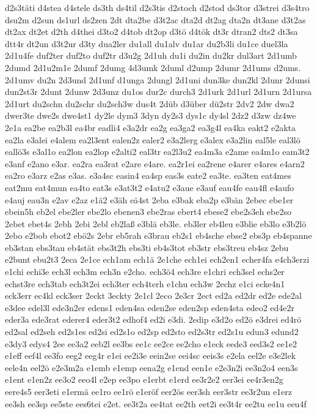 {d2s3täti
d4stea
d4stele
ds3th
ds4til
d2s3tis
d2stoch
d2stod
ds3tor
d3strei
d3s4tro
dsu2m
d2sun
ds1url
ds2zen
2dt
dta2be
d3t2ac
dta2d
dt2ag
dta2n
dt3ane
d3t2as
dt2ax
dt2et
d2th
d4thei
d3to2
d4tob
dt2op
d3tö
d4tök
dt3r
dtran2
dts2
dt3sa
dtt4r
dt2un
d3t2ur
d3ty
dua2ler
du1all
du1alv
du1ar
du2b3li
du1ce
duel3la
2d1u4fe
duf2ter
duf2to
duf2tr
d3u2g
2d1uh
du1i
du2in
du2kr
dul3art
2d1umb
2dumd
2d1u2m1e
2dumf
2dumg
4d3umk
2duml
d2ump
2dumr
2d1ums
d2ums.
2d1umv
du2n
2d3und
2d1unf
d1unga
2dungl
2d1uni
dun3ke
dun2kl
2dunr
2dunsi
dun2st3r
2dunt
2dunw
2d3unz
du1os
dur2c
durch3
2d1urk
2d1url
2d1urn
2d1ursa
2d1urt
du2schn
du2schr
du2sch3w
dus4t
2düb
d3über
dü2str
2dv2
2dw
dwa2
dwer3te
dwe2s
dwe4st1
dy2le
dym3
3dyn
dy2s3
dys1c
dy4sl
2dz2
d3zw
dz4we
2e1a
ea2be
ea2b3l
ea4br
eadli4
e3a2dr
ea2g
ea3ga2
ea3g4l
ea4ka
eakt2
e2akta
ea2la
e3alei
e4alem
ea2l3ent
ealen2z
ealer2
e3a2lerg
e3alex
e3a2lin
eal5le
eal3lö
eallö3s
e3al1o
ea2lon
ea2lop
e2alti2
eal3tr
ea2l3u2
ea4m3a
e2ame
ea4m1o
eam3t2
e3anf
e2ano
e3ar.
ea2ra
ea3rat
e2are
e4are.
ea2r1ei
ea2rene
e4arer
e4ares
e4arn2
ea2ro
e3arz
e2as
e3as.
e3a4sc
easin4
ea4sp
eas3s
eate2
ea3te.
ea3ten
eat4mes
eat2mu
eat4mun
ea4to
eat3s
e3at3t2
e4atu2
e3aue
e3auf
eau4fe
eau4fl
e4aufo
e4auj
eau3n
e2av
e2az
e1ä2
e3äh
eä4st
2eba
e3bak
eba2p
e3bän
2ebec
ebe1er
ebein5h
eb2el
ebe2ler
ebe2lo
ebenen3
ebe2ras
ebert4
ebese2
ebe2s3eh
ebe2so
2ebet
ebet4s
2ebh
2ebi
2ebl
eb2laß
e3blä
eb3le.
eb3ler
eb4leu
e3blie
eb3lo
e3b2lö
2ebo
e2bob
ebot2
ebö2s
2ebr
eb5rah
e3brau
eb2s1
eb4sche
ebse2
ebs3p
eb4spanne
eb3stan
ebs3tau
eb4stät
ebs3t2h
ebs3ti
eb4s3tot
eb3str
ebs3treu
eb4sz
2ebu
e2bunt
ebu2t3
2eca
2e1ce
ech1am
ech1ä
2e1che
ech1ei
ech2en1
echer4fa
e4ch3erzi
e1chi
echi3e
ech3l
ech3m
ech3n
e2cho.
ech3ö4
ech3re
e1chri
ech3sel
echs2er
echst3re
ech3tab
ech3t2ei
ech3ter
ech4terh
e1chu
ech3w
2echz
e1ci
ecke4n1
eck3err
ec4kl
eck3ser
2eckt
3eckty
2e1cl
2eco
2e3cr
2ect
ed2a
ed2dr
ed2e
ede2al
e3dee
edel3l
ede3n2er
edens1
eden4sa
eden2se
eden2sp
eden4sta
edeo2
ed4e2r
eder3a
ede3rat
ederer4
eder3t2
edhof4
ed2i
e3di.
2edip
e3d2o
ed2ö
e3drei
ed4rö
ed2sal
ed2seh
ed2s1es
ed2si
ed2s1o
ed2sp
ed2sto
ed2s3tr
ed2s1u
edun3
edund2
e3dy3
edys4
2ee
ee3a2
eeb2l
ee3bs
ee1c
ee2ce
ee2cho
e1eck
eede3
eed3s2
ee1e2
e1eff
eef4l
ee3fo
eeg2
eeg4r
e1ei
ee2i3e
eein2se
eei4sc
eeis3s
e2ela
eel2e
e3e2lek
eele4n
eel2ö
e2e3m2a
e1emb
e1emp
eena2g
e1end
een1e
e2e3n2i
ee3n2o4
een3s
e1ent
e1en2z
ee3o2
eeo4l
e2ep
ee3po
e1erbt
e1erd
ee3r2e2
eer3ei
ee4r3en2g
eere4s5
eer3eti
e1ermä
ee1ro
ee1rö
e1eröf
eer2ös
eer3sh
eer3str
ee3r2un
e1erz
ee3sh
ee3sp
ee5ste
ees6tei
e2et.
ee3t2a
ee4tat
ee2th
eet2i
ee3t4r
ee2tu
ee1u
eeu4f
}
